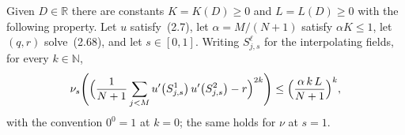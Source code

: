 \begin{theorem}\label{thm:sg-tal:perceptron-empirical-high-moments}
  \leanok
Given $D\in\mathbb R$ there are constants $K=K(D)\ge0$ and $L=L(D)\ge0$ with the following property. Let $u$
satisfy~(2.7), let $\alpha=M/(N+1)$ satisfy $\alpha K\le 1$, let $(q,r)$ solve~(2.68), and let $s\in[0,1]$.
Writing $S^\ell_{j,s}$ for the interpolating fields, for every $k\in\mathbb N$,
\[
 \nu_s\Biggl(\Bigl(\frac1{N+1}\sum_{j<M}u'\bigl(S^1_{j,s}\bigr)\,u'\bigl(S^2_{j,s}\bigr)-r\Bigr)^{2k}\Biggr)
 \le\Bigl(\frac{\alpha\,k\,L}{N+1}\Bigr)^{k},
\]
with the convention $0^0=1$ at $k=0$; the same holds for $\nu$ at $s=1$.
\end{theorem}
